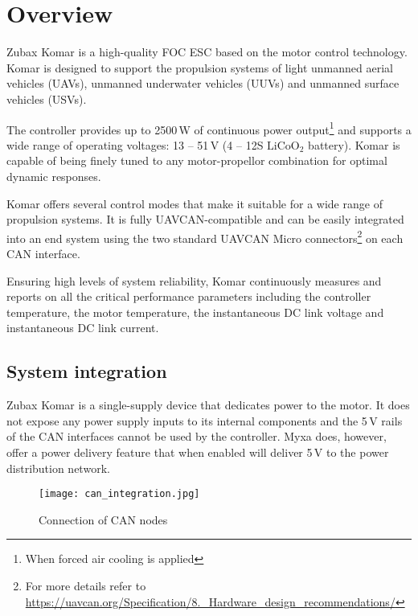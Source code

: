 \chapter{Overview}

Zubax Komar is a high-quality FOC ESC based on the  motor control technology. Komar is designed 
to support the propulsion systems of light unmanned aerial vehicles (UAVs), unmanned underwater vehicles (UUVs) and
unmanned surface vehicles (USVs).

The controller provides up to 2500\,W of continuous power output\footnote{When forced air cooling is applied} and
supports a wide range of operating voltages: 13 -- 51\,V (4 -- 12S $\text{LiCoO}_\text{2}$ battery).
Komar is capable of being finely tuned to any motor-propellor combination for optimal dynamic responses.

Komar offers several control modes that make it suitable for a wide range of propulsion systems.
It is fully UAVCAN-compatible and can be easily integrated into an end system using the two standard UAVCAN
Micro connectors\footnote{For more details refer to
\url{https://uavcan.org/Specification/8._Hardware_design_recommendations/}} on each CAN interface.

Ensuring high levels of system reliability, Komar continuously measures and reports on all the critical
performance parameters including the controller temperature, the motor temperature, the instantaneous
DC link voltage and instantaneous DC link current.

\section{System integration}
Zubax Komar is a single-supply device that dedicates power to the motor. It does not expose any power supply
inputs to its internal components and the 5\,V rails of the CAN interfaces cannot be used by the controller.
Myxa does, however, offer a power delivery feature that when enabled will deliver 5\,V to the power
distribution network.

\begin{figure}[h]
    \centering
    \texttt{[image: can\_integration.jpg]}
    \caption{Connection of CAN nodes}
\end{figure}
